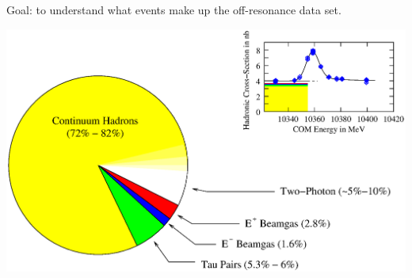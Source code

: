 


 

\begin{slide*}

\slideframe{}
\huge
{}

\begin{minipage}[t]{\linewidth}
\Huge

\vspace{1 cm}

Goal: to understand what events make up the off-resonance data set.

\vspace{1 cm}

\begin{center}
  \includegraphics[width=\linewidth]{pie.eps}
\end{center}

\end{minipage}

\end{slide*}

